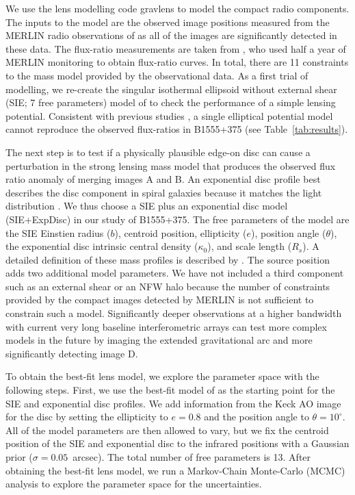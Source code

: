 \documentclass[a4paper,fleqn,usenatbib,useAMS]{mnras}
\begin{document}
We use the lens modelling code {\sc gravlens} \citep{Kee01} to model the compact radio components. The inputs to the model are the observed image positions measured from the MERLIN radio observations of \citet{Marlow99} as all of the images are significantly detected in these data. The flux-ratio measurements are taken from \citet{K03}, who used half a year of MERLIN monitoring to obtain flux-ratio curves. In total, there are 11 constraints to the mass model provided by the observational data. As a first trial of modelling, we re-create the singular isothermal ellipsoid without external shear (SIE; 7 free parameters) model of \citet{Marlow99} to check the performance of a simple lensing potential. Consistent with previous studies \citep{Marlow99,Xu15}, a single elliptical potential model cannot reproduce the observed flux-ratios in B1555+375 (see Table~\ref{tab:results}). 

The next step is to test if a physically plausible edge-on disc can cause a perturbation in the strong lensing mass model that produces the observed flux ratio anomaly of  merging images A and B. An exponential disc profile best describes the disc component in spiral galaxies because it matches the light distribution \citep{Kee98}. We thus choose a SIE plus an exponential disc model (SIE+ExpDisc) in our study of B1555+375. The free parameters of the model are the SIE Einstien radius ($b$), centroid position, ellipticity ($e$), position angle ($\theta$), the exponential disc intrinsic central density ($\kappa_0$), and scale length ($R_s$). A detailed definition of these mass profiles is described by \citet{Kee01}. The source position adds two additional model parameters. We have not included a third component such as an external shear or an NFW halo because the number of constraints provided by the compact images detected by MERLIN is not sufficient to constrain such a model. Significantly deeper observations at a higher bandwidth with current very long baseline interferometric arrays can test more complex models in the future by imaging the extended gravitational arc and more significantly detecting image D. 

To obtain the best-fit lens model, we explore the parameter space with the following steps. First, we use the best-fit model of \citet{Marlow99} as the starting point for the SIE and exponential disc profiles. We add information from the Keck AO image for the disc by setting the ellipticity to $e=0.8$ and the position angle to $\theta=10^\circ$.  All of the model parameters are then allowed to vary, but we fix the centroid position of the SIE and exponential disc to the infrared positions with a Gaussian prior ($\sigma = 0.05 $~arcsec). The total number of free parameters is 13. After obtaining the best-fit lens model, we run a Markov-Chain Monte-Carlo (MCMC) analysis to explore the parameter space for the uncertainties.
\end{document}
